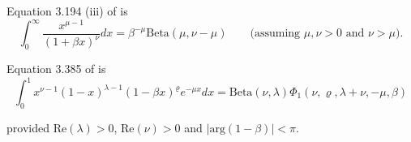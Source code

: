 Equation 3.194 (iii) of \citep{Gradshteyn1988} is
\begin{equation}\label{res:03}
	\int_0^\infty \frac{ x^{\mu - 1} }{(1 + \beta x)^\nu} dx = \beta^{-\mu} \mbox{Beta}(\mu,\nu - \mu) \quad \quad \mbox{(assuming $\mu,\nu>0$ and $\nu>\mu$).}
\end{equation}

Equation 3.385 of \citep{Gradshteyn1988} is
\begin{equation} \label{res:04}
	\int_{0}^1 x^{\nu - 1} (1 - x)^{\lambda - 1}(1 - \beta x)^{\varrho} e^{-\mu x} dx = \mbox{Beta}(\nu,\lambda) \Phi_1(\nu,\varrho,\lambda+\nu,-\mu,\beta)
\end{equation}

\noindent provided $\mbox{Re}(\lambda)>0$, $\mbox{Re}(\nu)>0$ and $|\mbox{arg}(1-\beta)|<\pi$.

